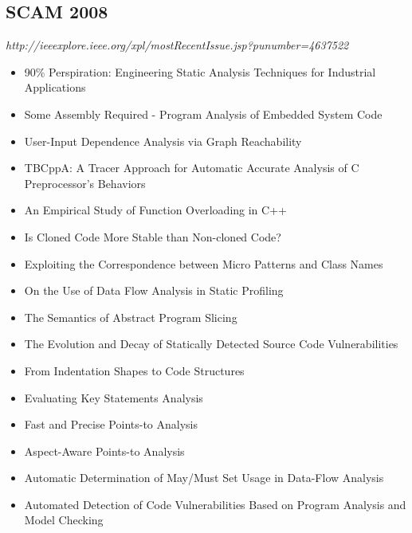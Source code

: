 \subsection{SCAM 2008}

{\small \em http://ieeexplore.ieee.org/xpl/mostRecentIssue.jsp?punumber=4637522}

{\small
\begin{itemize}[itemsep=-1ex]
  \item 90\% Perspiration: Engineering Static Analysis Techniques for Industrial Applications {\color{blue} \checkmark}{\color{red} \texttimes}
  \item Some Assembly Required - Program Analysis of Embedded System Code {\color{blue} \checkmark}{\color{red} \texttimes}
  \item User-Input Dependence Analysis via Graph Reachability {\color{blue} \checkmark}{\color{red} \texttimes}
  \item TBCppA: A Tracer Approach for Automatic Accurate Analysis of C Preprocessor's Behaviors {\color{blue} \checkmark}{\color{red} \texttimes}
  \item An Empirical Study of Function Overloading in C++ {\color{blue} \checkmark}{\color{red} \texttimes}
  \item Is Cloned Code More Stable than Non-cloned Code? {\color{blue} \checkmark}{\color{red} \texttimes}
  \item Exploiting the Correspondence between Micro Patterns and Class Names {\color{blue} \checkmark}{\color{red} \texttimes}
  \item On the Use of Data Flow Analysis in Static Profiling {\color{blue} \checkmark}{\color{red} \texttimes}
  \item The Semantics of Abstract Program Slicing
  \item The Evolution and Decay of Statically Detected Source Code Vulnerabilities {\color{blue} \checkmark}{\color{red} \texttimes}
  \item From Indentation Shapes to Code Structures
  \item Evaluating Key Statements Analysis
  \item Fast and Precise Points-to Analysis
  \item Aspect-Aware Points-to Analysis {\color{blue} \checkmark}{\color{red} \texttimes}
  \item Automatic Determination of May/Must Set Usage in Data-Flow Analysis
  \item Automated Detection of Code Vulnerabilities Based on Program Analysis and Model Checking

\end{itemize}}
